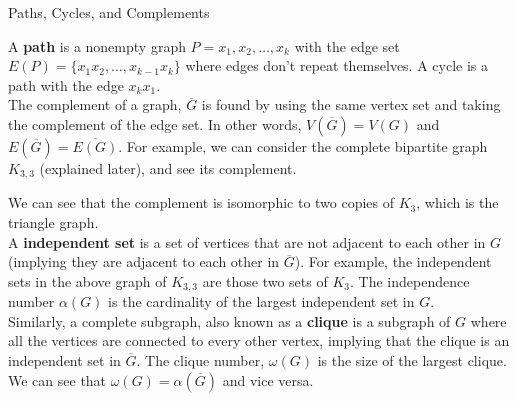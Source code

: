 \documentclass[10pt]{extarticle}
\begin{document}
\begin{problem}{Paths, Cycles, and Complements}

  A \textbf{path} is a nonempty graph $P = x_1,x_2,\dots,x_k$ with the edge set $E(P) = \{x_1x_2,\dots,x_{k-1}x_k\}$ where edges don't repeat themselves. A cycle is a path with the edge $x_kx_1$.\\

  The complement of a graph, $\overline{G}$ is found by using the same vertex set and taking the complement of the edge set. In other words, $V(\overline{G}) = V(G)$ and $E(\overline{G}) = \overline{E(G)}$. For example, we can consider the complete bipartite graph $K_{3,3}$ (explained later), and see its complement.
  \begin{center}
  \end{center}
  \begin{center}
  \end{center}
  We can see that the complement is isomorphic to two copies of $K_3$, which is the triangle graph.\\

  A \textbf{independent set} is a set of vertices that are not adjacent to each other in $G$ (implying they are adjacent to each other in $\overline{G}$). For example, the independent sets in the above graph of $K_{3,3}$ are those two sets of $K_3$. The independence number $\alpha(G)$ is the cardinality of the largest independent set in $G$.\\

  Similarly, a complete subgraph, also known as a \textbf{clique} is a subgraph of $G$ where all the vertices are connected to every other vertex, implying that the clique is an independent set in $\overline{G}$. The clique number, $\omega(G)$ is the size of the largest clique. We can see that $\omega(G) = \alpha(\overline{G})$ and vice versa.
\end{problem}
\end{document}
